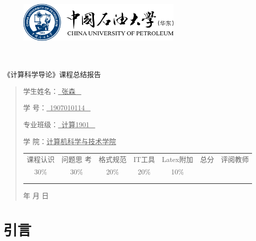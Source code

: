 \documentclass{article}
\renewcommand{\today}{\number\year 年 \number\month 月 \number\day 日}
\begin{document}
\begin{figure}
    \centering
    \includegraphics[width=8cm]{upc.png}
    \label{figupc}
\end{figure}

\begin{center}
	\quad \\
	\quad \\
	\heiti \fontsize{45}{17} \quad \quad \quad
	\vskip 1.5cm
	\heiti {} 《计算科学导论》课程总结报告
\end{center}

\vskip 2.0cm
	
\begin{quotation}
	\doublespacing
    \par\setlength\parindent{7em}
	\quad

	学生姓名：\underline{\quad \qquad \ 张森 \ \qquad \quad}

	学\hspace{0.6cm} 号：\underline{\qquad \ 1907010114 \ \qquad}
		
	专业班级：\underline{\qquad \ 计算1901 \ \qquad  }
		
    学\hspace{0.6cm} 院：\underline{计算机科学与技术学院}

	\vskip 2cm
	\centering
	\begin{table}[h]
        \centering
        \begin{tabular}{|c|c|c|c|c|c|c|}
            \hline
            课程认识 & 问题思 考 & 格式规范  & IT工具  & Latex附加  & 总分 & 评阅教师 \\
            30\% & 30\% & 20\% & 20\% & 10\% &  &  \\
            \hline
             & & & & & &\\
             & & & & & &\\
            \hline
        \end{tabular}
    \end{table}
	\vskip 2cm
	\today
\end{quotation}

\thispagestyle{empty}
\newpage

\setcounter{page}{1}

\section{引言}
\end{document}
